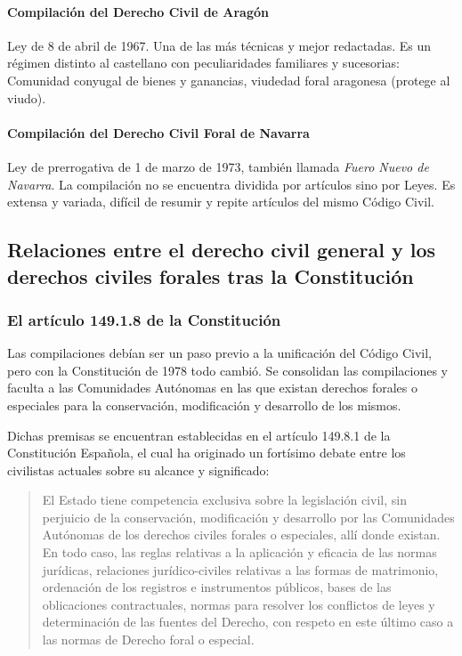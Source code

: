 \documentclass[a4paper,12pt]{report}
\begin{document}
\paragraph{Compilación del Derecho Civil de Aragón}

Ley de 8 de abril de 1967. Una de las más técnicas y mejor redactadas. Es un
régimen distinto al castellano con peculiaridades familiares y sucesorias:
Comunidad conyugal de bienes y ganancias, viudedad foral aragonesa (protege al
viudo).

\paragraph{Compilación del Derecho Civil Foral de Navarra}

Ley de prerrogativa de 1 de marzo de 1973, también llamada \emph{Fuero Nuevo de
Navarra}. La compilación no se encuentra dividida por artículos sino por Leyes.
Es extensa y variada, difícil de resumir y repite artículos del mismo Código
Civil.

\subsection{Relaciones entre el derecho civil general y los derechos civiles forales tras la Constitución}
\subsubsection{El artículo 149.1.8 de la Constitución}

Las compilaciones debían ser un paso previo a la unificación del Código Civil,
pero con la Constitución de 1978 todo cambió. Se consolidan las compilaciones y
faculta a las Comunidades Autónomas en las que existan derechos forales o
especiales para la conservación, modificación y desarrollo de los mismos.

Dichas premisas se encuentran establecidas en el artículo 149.8.1 de la
Constitución Española, el cual ha originado un fortísimo debate entre los
civilistas actuales sobre su alcance y significado:

\begin{quote}
    El Estado tiene competencia exclusiva sobre la legislación civil, sin
    perjuicio de la conservación, modificación y desarrollo por las Comunidades
    Autónomas de los derechos civiles forales o especiales, allí donde existan.
    En todo caso, las reglas relativas a la aplicación y eficacia de las normas
    jurídicas, relaciones jurídico-civiles relativas a las formas de matrimonio,
    ordenación de los registros e instrumentos públicos, bases de las
    oblicaciones contractuales, normas para resolver los conflictos de leyes y
    determinación de las fuentes del Derecho, con respeto en este último caso a
    las normas de Derecho foral o especial.
\end{quote}
\end{document}
